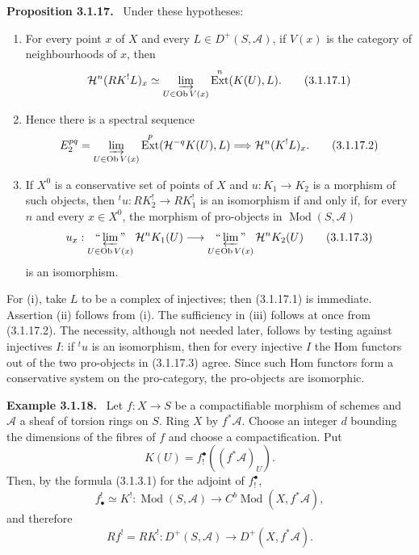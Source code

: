 \documentclass[12pt]{article}
\newcommand{\Aa}{\mathcal A}
\DeclareMathOperator{\Ext}{Ext}
\DeclareMathOperator{\Ob}{Ob}
\DeclareMathOperator{\Mod}{Mod}
\newenvironment{statement}[1]{\par\medskip\noindent\textbf{#1.}\ }{\par\medskip}
\newenvironment{remarktext}[1]{\par\medskip\noindent\textbf{#1.}\ }{\par\medskip}
\begin{document}
\begin{statement}{Proposition 3.1.17}
Under these hypotheses:
\begin{enumerate}[label=(\roman*)]
\item For every point $x$ of $X$ and every $L\in D^+(S,\Aa)$, if $V(x)$ is the category of neighbourhoods of $x$, then
\begin{equation}
   \mathcal H^n(RK^!L)_x\simeq
   \varinjlim_{U\in\Ob V(x)}\Ext^n(K(U),L). \tag{3.1.17.1}
\end{equation}
\item Hence there is a spectral sequence
\begin{equation}
   E_2^{pq}=\varinjlim_{U\in\Ob V(x)}\Ext^p(\mathcal H^{-q}K(U),L)
   \Longrightarrow \mathcal H^n(K^!L)_x. \tag{3.1.17.2}
\end{equation}
\item If $X^0$ is a conservative set of points of $X$ and $u:K_1\to K_2$ is a morphism of such objects, then $^tu:RK_2^!\to RK_1^!$ is an isomorphism if and only if, for every $n$ and every $x\in X^0$, the morphism of pro-objects in $\Mod(S,\Aa)$
\begin{equation}
   u_x:\mathop{``\varprojlim\mbox{''}}_{U\in\Ob V(x)}\mathcal H^nK_1(U)
   \longrightarrow
   \mathop{``\varprojlim\mbox{''}}_{U\in\Ob V(x)}\mathcal H^nK_2(U) \tag{3.1.17.3}
\end{equation}
is an isomorphism.
\end{enumerate}
\end{statement}

For (i), take $L$ to be a complex of injectives; then (3.1.17.1) is immediate. Assertion (ii) follows from (i). The sufficiency in (iii) follows at once from (3.1.17.2). The necessity, although not needed later, follows by testing against injectives $I$: if $^tu$ is an isomorphism, then for every injective $I$ the Hom functors out of the two pro-objects in (3.1.17.3) agree. Since such Hom functors form a conservative system on the pro-category, the pro-objects are isomorphic.

\begin{remarktext}{Example 3.1.18}
Let $f:X\to S$ be a compactifiable morphism of schemes and $\Aa$ a sheaf of torsion rings on $S$. Ring $X$ by $f^*\Aa$. Choose an integer $d$ bounding the dimensions of the fibres of $f$ and choose a compactification. Put
\begin{equation}
   K(U)=f_!^{\bullet}((f^*\Aa)_U). \tag{3.1.18.1}
\end{equation}
Then, by the formula (3.1.3.1) for the adjoint of $f_!^{\bullet}$,
\begin{equation}
   f^!_{\bullet}\simeq K^!: \Mod(S,\Aa)\longrightarrow C^b\Mod(X,f^*\Aa), \tag{3.1.18.2}
\end{equation}
and therefore
\begin{equation}
   Rf^!=RK^!:D^+(S,\Aa)\longrightarrow D^+(X,f^*\Aa). \tag{3.1.18.3}
\end{equation}
\end{remarktext}
\end{document}
